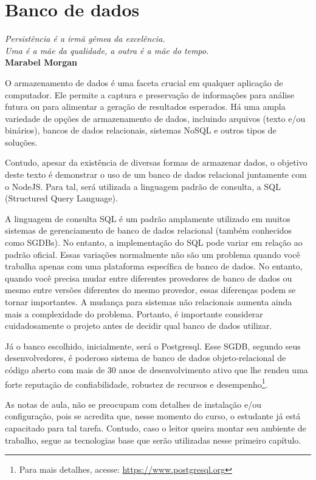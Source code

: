 \chapter{Banco de dados}\label{cap:cap1}

\begin{flushright}
  \textit{
    Persistência é a irmã gêmea da excelência. \\
    Uma é a mãe da qualidade, a outra é a mãe do tempo.
  } \\
  
  \textbf{Marabel Morgan}
\end{flushright}

O armazenamento de dados é uma faceta crucial em qualquer aplicação de computador. Ele permite a captura e preservação de informações para análise futura ou para alimentar a geração de resultados esperados. Há uma ampla variedade de opções de armazenamento de dados, incluindo arquivos (texto e/ou binários), bancos de dados relacionais, sistemas NoSQL e outros tipos de soluções.

Contudo, apesar da existência de diversas formas de armazenar dados, o objetivo deste texto é demonstrar o uso de um banco de dados relacional juntamente com o NodeJS. Para tal, será utilizada a linguagem padrão de consulta, a SQL (Structured Query Language).

A linguagem de consulta SQL é um padrão amplamente utilizado em muitos sistemas de gerenciamento de banco de dados relacional (também conhecidos como SGDBs). No entanto, a implementação do SQL pode variar em relação ao padrão oficial. Essas variações normalmente não são um problema quando você trabalha apenas com uma plataforma específica de banco de dados. No entanto, quando você precisa mudar entre diferentes provedores de banco de dados ou mesmo entre versões diferentes do mesmo provedor, essas diferenças podem se tornar importantes. A mudança para sistemas não relacionais aumenta ainda mais a complexidade do problema. Portanto, é importante considerar cuidadosamente o projeto antes de decidir qual banco de dados utilizar. 

Já o banco escolhido, inicialmente, será o Postgresql. Esse SGDB, segundo seus desenvolvedores, é poderoso sistema de banco de dados objeto-relacional de código aberto com mais de 30 anos de desenvolvimento ativo que lhe rendeu uma forte reputação de confiabilidade, robustez de recursos e desempenho\footnote{Para mais detalhes, acesse: \url{https://www.postgresql.org}}. 

As notas de aula, não se preocupam com detalhes de instalação e/ou configuração, pois se acredita que, nesse momento do curso, o estudante já está capacitado para tal tarefa. Contudo, caso o leitor queira montar seu ambiente de trabalho, segue as tecnologias base que serão utilizadas nesse primeiro capítulo.

